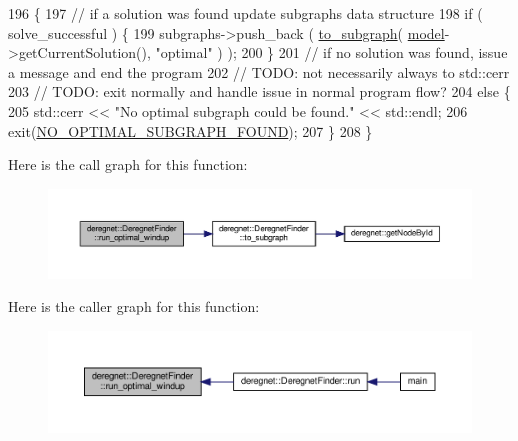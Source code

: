 \begin{DoxyCode}
196                                                                                                            
         \{
197     \textcolor{comment}{// if a solution was found update subgraphs data structure}
198     \textcolor{keywordflow}{if} ( solve\_successful ) \{
199         subgraphs->push\_back ( \hyperlink{classderegnet_1_1DeregnetFinder_a681d5e2506f9b6075ab36e742a360328}{to\_subgraph}( \hyperlink{classderegnet_1_1DeregnetFinder_ad922d8e38124b4c75daac29a928fcf5b}{model}->getCurrentSolution(), \textcolor{stringliteral}{"optimal"} ) );
200     \}
201     \textcolor{comment}{// if no solution was found, issue a message and end the program}
202     \textcolor{comment}{// TODO: not necessarily always to std::cerr}
203     \textcolor{comment}{// TODO: exit normally and handle issue in normal program flow?}
204     \textcolor{keywordflow}{else} \{
205         std::cerr << \textcolor{stringliteral}{"No optimal subgraph could be found."} << std::endl;
206         exit(\hyperlink{DeregnetData_8hpp_a4cfde67e3f13f361cd54de13be284610}{NO\_OPTIMAL\_SUBGRAPH\_FOUND});
207     \}
208 \}
\end{DoxyCode}
Here is the call graph for this function\+:\nopagebreak
\begin{figure}[H]
\begin{center}
\leavevmode
\includegraphics[width=350pt]{classderegnet_1_1DeregnetFinder_a92610c1444ba271820e64d224ec64bb7_cgraph}
\end{center}
\end{figure}
Here is the caller graph for this function\+:\nopagebreak
\begin{figure}[H]
\begin{center}
\leavevmode
\includegraphics[width=350pt]{classderegnet_1_1DeregnetFinder_a92610c1444ba271820e64d224ec64bb7_icgraph}
\end{center}
\end{figure}
\mbox{\label{classderegnet_1_1DeregnetFinder_ad996cee997a5db4e09016a6f725a6701}} 

